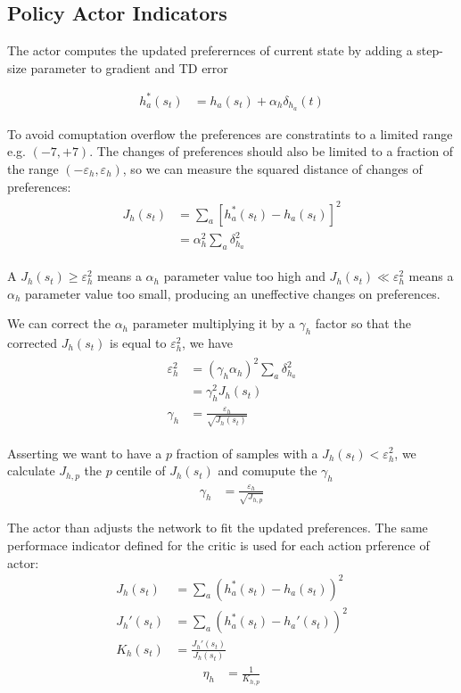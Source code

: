\documentclass[]{article}
\begin{document}
\subsection{Policy Actor Indicators}

The actor computes the updated preferernces of current state by adding a step-size parameter to gradient and TD error

\begin{align*}
	h_a^*(s_t)&	= h_a(s_t) + \alpha_h \delta_{h_a}(t)
\end{align*}

To avoid comuptation overflow the preferences are constratints to a limited range e.g. $ (-7, +7) $.
The changes of preferences should also be limited to a fraction of the range $ (-\varepsilon_h, \varepsilon_h) $, so we can measure the squared distance of changes of preferences:
\begin{align}
\begin{split}
	J_h(s_t)&		= \sum_a
		\left[
			h_a^*(s_t) - h_a(s_t)
		\right] ^2
	\\
	&	 = \alpha_h^2 \sum_a \delta_{h_a}^2
\end{split}
\end{align}

A $ J_h(s_t) \ge \varepsilon_h^2 $ means a $ \alpha_h $ parameter value too high and $ J_h(s_t) \ll \varepsilon_h^2 $ means a $ \alpha_h $ parameter value too small, producing an uneffective changes on preferences.

We can correct the $ \alpha_h $ parameter multiplying it by a $ \gamma_h $ factor so that the corrected $ J_h(s_t) $ is equal to $ \varepsilon_h^2 $, we have
\begin{align*}
\begin{split}
	\varepsilon_h^2&	= (\gamma_h \alpha_h)^2 \sum_a \delta_{h_a}^2
	\\
	&					= \gamma_h^2 J_h(s_t)
	\\
	\gamma_h&			= \frac{\varepsilon_h}{\sqrt{J_h(s_t)}}
\end{split}
\end{align*}

Asserting we want to have a $ p $ fraction of samples with a $ J_h(s_t) < \varepsilon_h^2 $, we calculate $ J_{h, p} $ the $ p $ centile of $ J_h(s_t) $ and comupute the $ \gamma_h $
\begin{align}
	\gamma_h&	= \frac{\varepsilon_h}{\sqrt{J_{h, p} } }
\end{align}

The actor than adjusts the network to fit the updated preferences.
The same performace indicator defined for the critic is used for each action prference of actor:
\begin{align*}
	J_h(s_t)&		= \sum_a (h_a^*(s_t) - h_a(s_t))^2
	\\
	J_h'(s_t)&	= \sum_a (h_a^*(s_t) - h_a'(s_t))^2
	\\
	K_h(s_t)&		= \frac{J_h'(s_t)}{J_h(s_t)}
\end{align*}
\begin{align}
	\eta_h&		= \frac{1}{K_{h, p}}
\end{align}
\end{document}

